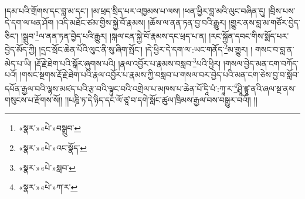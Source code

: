 །དམ་པའི་གྲོགས་དང་བླ་མ་དང་། །མ་ཕྲད་སྲིད་པར་འཁྱམས་པ་ལས། །ཕན་ཕྱིར་བླ་མའི་ལུང་བཞིན་དུ། །བྲིས་པས་དེ་དག་ལ་ཕན་ཤོག །འདི་མཐོང་ཙམ་གྱིས་སྐྱེ་བོ་རྣམས། །ཆོས་ལ་ནན་ཏན་བྱ་བའི་རྒྱུར། །གྱུར་ནས་བླ་མ་གཙོར་བྱེད་ཅིང་། །སྒྲུབ་\footnote{«སྣར་»«པེ་»བསྒྲུབ་}ལ་ནན་ཏན་བྱེད་པའི་རྒྱུར། །སྐལ་ངན་སྐྱེ་བོ་རྣམས་དང་ཕྲད་པ་ན། །རང་སྐྱོན་དབང་གིས་སྨོད་པར་བྱེད་མོད་ཀྱི། །དྲང་སྲོང་ཆེན་པོའི་ལུང་ནི་སུ་ཞིག་སྤོང་། །དེ་ཕྱིར་དེ་དག་ལ་:ཡང་གནོད་\footnote{«སྣར་»«པེ་»འང་སྣོད་}མ་གྱུར། །
གསང་བ་བླ་ན་མེད་པ་ཡི། །རྡོ་རྗེ་ཐེག་པའི་སྒོར་ཞུགས་པའི། །རྣལ་འབྱོར་པ་རྣམས་བསླབ་\footnote{«སྣར་»«པེ་»སླབ་}པའི་ཕྱིར། །གསལ་བྱེད་མན་ངག་བཀོད་པའོ། །གསང་སྔགས་རྡོ་རྗེ་ཐེག་པའི་རྣལ་འབྱོར་པ་རྣམས་ཀྱི་བསླབ་པ་གསལ་བར་བྱེད་པའི་མན་ངག་ཅེས་བྱ་བ་སློབ་དཔོན་རྒྱལ་བའི་ལྷས་མཛད་པའི་རྩ་བའི་ལྟུང་བའི་འགྲེལ་པ་མཁས་པ་ཆེན་པོ་དཱི་པཾ་:ཀཱ་ར་\footnote{«སྣར་»«པེ་»ཀ་ར་}ཤྲཱི་ཛྙཱ་ནའི་ཞལ་སྔ་ནས་གསུངས་པ་རྫོགས་སོ།། །།པཎྜི་ཏ་དེ་ཉིད་དང་ལོ་ཙཱ་བ་དགེ་སློང་ཚུལ་ཁྲིམས་རྒྱལ་བས་བསྒྱུར་བའོ།། །།